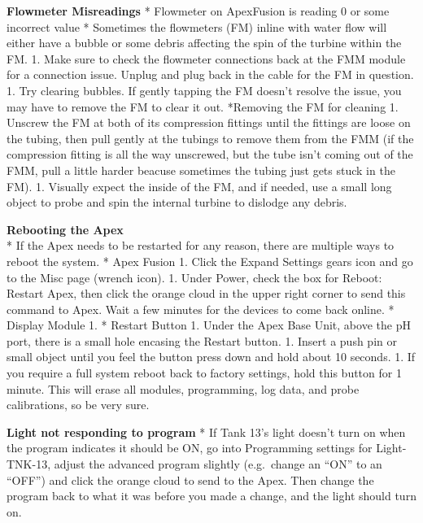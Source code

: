 \documentclass[]{book}
\begin{document}
 \textbf{Flowmeter Misreadings} * Flowmeter on ApexFusion is reading 0
or some incorrect value * Sometimes the flowmeters (FM) inline with
water flow will either have a bubble or some debris affecting the spin
of the turbine within the FM. 1. Make sure to check the flowmeter
connections back at the FMM module for a connection issue. Unplug and
plug back in the cable for the FM in question. 1. Try clearing bubbles.
If gently tapping the FM doesn't resolve the issue, you may have to
remove the FM to clear it out. *Removing the FM for cleaning 1. Unscrew
the FM at both of its compression fittings until the fittings are loose
on the tubing, then pull gently at the tubings to remove them from the
FMM (if the compression fitting is all the way unscrewed, but the tube
isn't coming out of the FMM, pull a little harder beacuse sometimes the
tubing just gets stuck in the FM). 1. Visually expect the inside of the
FM, and if needed, use a small long object to probe and spin the
internal turbine to dislodge any debris.

 \textbf{Rebooting the Apex}\\
* If the Apex needs to be restarted for any reason, there are multiple
ways to reboot the system. * Apex Fusion 1. Click the Expand Settings
gears icon and go to the Misc page (wrench icon). 1. Under Power, check
the box for Reboot: Restart Apex, then click the orange cloud in the
upper right corner to send this command to Apex. Wait a few minutes for
the devices to come back online. * Display Module 1. * Restart Button 1.
Under the Apex Base Unit, above the pH port, there is a small hole
encasing the Restart button. 1. Insert a push pin or small object until
you feel the button press down and hold about 10 seconds. 1. If you
require a full system reboot back to factory settings, hold this button
for 1 minute. This will erase all modules, programming, log data, and
probe calibrations, so be very sure.

 \textbf{Light not responding to program} * If Tank 13's light doesn't
turn on when the program indicates it should be ON, go into Programming
settings for Light-TNK-13, adjust the advanced program slightly
(e.g.~change an ``ON'' to an ``OFF'') and click the orange cloud to send
to the Apex. Then change the program back to what it was before you made
a change, and the light should turn on.
\end{document}
